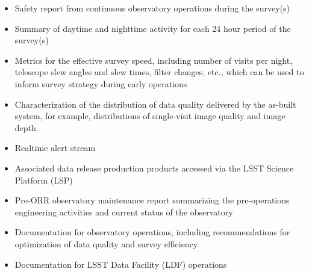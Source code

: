 \begin{itemize}
\item Safety report from continuous observatory operations during the survey(s)
\item Summary of daytime and nighttime activity for each 24 hour period of the survey(s)
\item Metrics for the effective survey speed, including number of visits per night, telescope slew angles and slew times, filter changes, etc., which can be used to inform survey strategy during early operations
\item Characterization of the distribution of data quality delivered by the as-built system, for example, distributions of single-visit image quality and image depth.
\item Realtime alert stream
\item Associated data release production products accessed via the LSST Science Platform (LSP)
\item Pre-ORR observatory maintenance report summarizing the pre-operations engineering activities and current status of the observatory
\item Documentation for observatory operations, including recommendations for optimization of data quality and survey efficiency
\item Documentation for LSST Data Facility (LDF) operations
\end{itemize}
